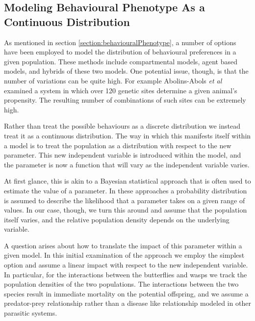 \documentclass[review]{elsarticle}
\begin{document}
\subsection{Modeling Behavioural Phenotype As a Continuous
  Distribution}

As mentioned in section \ref{section:behaviouralPhenotype}, a number
of options have been employed to model the distribution of behavioural
preferences in a given population. These methods include compartmental
models, agent based models, and hybrids of these two models. One
potential issue, though, is that the number of variations can be quite
high. For example Abolins-Abols \textit{et al} examined a system in
which over 120 genetic sites determine a given animal's
propensity\cite{doi:10.1111/mec.14878}. The resulting number of
combinations of such sites can be extremely high.

Rather than treat the possible behaviours as a discrete distribution
we instead treat it as a continuous distribution. The way in which
this manifests itself within a model is to treat the population as a
distribution with respect to the new parameter. This new independent
variable is introduced within the model, and the parameter is now a
function that will vary as the independent variable varies.

At first glance, this is akin to a Bayesian statistical approach that
is often used to estimate the value of a
parameter\cite{doi:10.1111/j.1467-9868.2007.00610.x,Fitzpatrick_1991}. In
these approaches a probability distribution is assumed to describe the
likelihood that a parameter takes on a given range of values. In our
case, though, we turn this around and assume that the population
itself varies, and the relative population density depends on the
underlying variable.

A question arises about how to translate the impact of this parameter
within a given model. In this initial examination of the approach we
employ the simplest option and assume a linear impact with respect to
the new independent variable. In particular, for the interactions
between the butterflies and wasps we track the population densities of
the two populations. The interactions between the two species result
in immediate mortality on the potential offspring, and we assume a
predator-prey relationship rather than a disease like relationship
modeled in other parasitic systems. 
\end{document}
